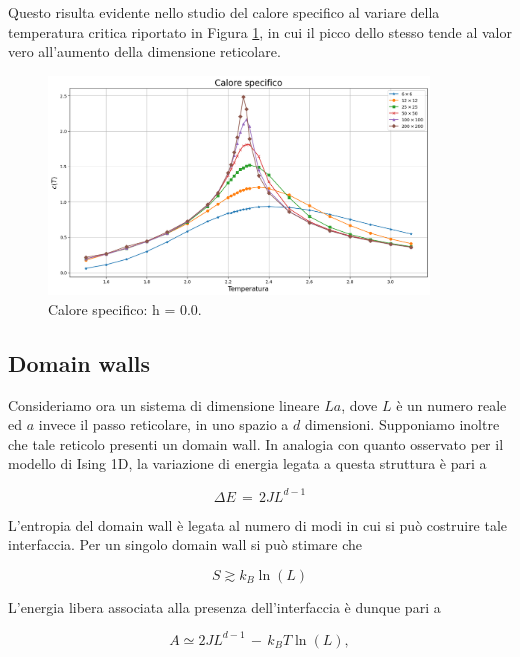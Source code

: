 Questo risulta evidente nello studio del calore specifico al variare della temperatura critica riportato in Figura \ref{fig: cp_Ising2D_crit}, in cui il 
picco dello stesso tende al valor vero all'aumento della dimensione reticolare.

\begin{figure}[H]
    \centering
    \includegraphics[width=0.9\textwidth]{Immagini/simIsing2D/cp.png}
    \caption{Calore specifico: h = 0.0.}
    \label{fig: cp_Ising2D_crit}
\end{figure}


\subsection{Domain walls}

Consideriamo ora un sistema di dimensione lineare $La$, dove $L$ è un numero reale ed $a$ invece il passo reticolare, in uno spazio a $d$ dimensioni. 
Supponiamo inoltre che tale reticolo presenti un domain wall. In analogia con quanto osservato per il modello di Ising 1D, la 
variazione di energia legata a questa struttura è pari a 

\begin{equation}
    \Delta E\,=\,2JL^{d-1}
    \label{eq: ene_dw_IsingdD}
\end{equation}

L'entropia del domain wall è legata al numero di modi in cui si può costruire tale interfaccia. Per un singolo domain wall si può 
stimare che 

\begin{equation}
    S \gtrsim k_B \ln{\left(L\right)}
    \label{eq: entr_dw_IsingdD}
\end{equation}

L'energia libera associata alla presenza dell'interfaccia è dunque pari a 

\begin{equation}
    A \simeq 2JL^{d-1}\,-\,k_B T\ln{\left(L\right)},
    \label{eq: freeE_dw_IsingdD}
\end{equation}

